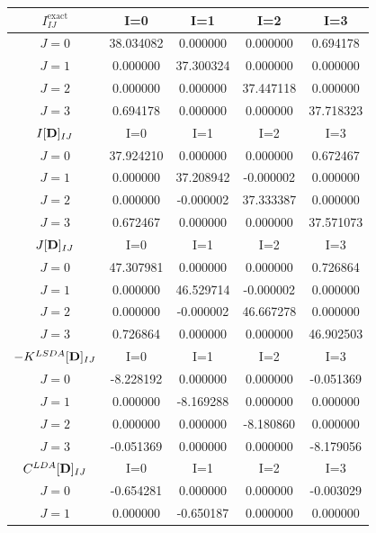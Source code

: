 

\begin{table}
\begin{tabular}{
  SSSSS
  }
    \toprule
{$I_{IJ}^{\text{exact}}$} & {I=0} & {I=1} & {I=2} & {I=3} \\
\midrule
{$J=0$} & 38.034082& 0.000000& 0.000000& 0.694178\\
{$J=1$} & 0.000000& 37.300324& 0.000000& 0.000000\\
{$J=2$} & 0.000000& 0.000000& 37.447118& 0.000000\\
{$J=3$} & 0.694178& 0.000000& 0.000000& 37.718323\\
\toprule
{$I[\mathbf{D}]_{IJ}$} & {I=0} & {I=1} & {I=2} & {I=3} \\
\midrule
{$J=0$} & 37.924210& 0.000000& 0.000000& 0.672467\\
{$J=1$} & 0.000000& 37.208942& -0.000002& 0.000000\\
{$J=2$} & 0.000000& -0.000002& 37.333387& 0.000000\\
{$J=3$} & 0.672467& 0.000000& 0.000000& 37.571073\\
\toprule
{$J[\mathbf{D}]_{IJ}$} & {I=0} & {I=1} & {I=2} & {I=3} \\
\midrule
{$J=0$} & 47.307981& 0.000000& 0.000000& 0.726864\\
{$J=1$} & 0.000000& 46.529714& -0.000002& 0.000000\\
{$J=2$} & 0.000000& -0.000002& 46.667278& 0.000000\\
{$J=3$} & 0.726864& 0.000000& 0.000000& 46.902503\\
\toprule
{$-K^{LSDA}[\mathbf{D}]_{IJ}$} & {I=0} & {I=1} & {I=2} & {I=3} \\
\midrule
{$J=0$} & -8.228192& 0.000000& 0.000000& -0.051369\\
{$J=1$} & 0.000000& -8.169288& 0.000000& 0.000000\\
{$J=2$} & 0.000000& 0.000000& -8.180860& 0.000000\\
{$J=3$} & -0.051369& 0.000000& 0.000000& -8.179056\\
\toprule
{$C^{LDA}[\mathbf{D}]_{IJ}$} & {I=0} & {I=1} & {I=2} & {I=3} \\
\midrule
{$J=0$} & -0.654281& 0.000000& 0.000000& -0.003029\\
{$J=1$} & 0.000000& -0.650187& 0.000000& 0.000000\\

\end{tabular}
\end{table}
